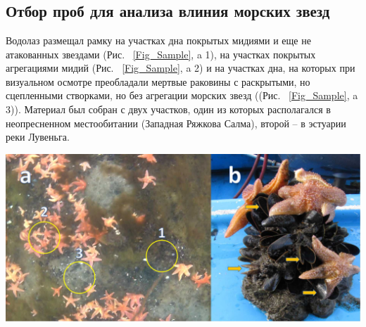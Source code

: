 \documentclass[20pt,a0,portrait]{a0poster}
\begin{document}
\begin{minipage}[t]{0.5\linewidth}

\section*{}

\subsection*{Отбор проб для анализа влиния морских звезд}

%
\begin{minipage}[t]{0.4\linewidth}
Водолаз размещал рамку на участках дна покрытых мидиями и еще не атакованных звездами (Рис. ~\ref{Fig_Sample}, a 1), на участках покрытых агрегациями мидий  (Рис. ~\ref{Fig_Sample}, a 2) и на участках дна, на которых при визуальном осмотре преобладали мертвые раковины с раскрытыми, но сцепленными створками, но без агрегации морских звезд ((Рис. ~\ref{Fig_Sample}, a 3)). Материал был собран с двух участков, один из которых располагался в неопресненном местообитании (Западная Ряжкова Салма), второй -- в эстуарии реки Лувеньга.
\end{minipage}\hspace{1cm}
%
\begin{minipage}[t]{0.5\linewidth}		
	\begin{center}\vspace{0.1cm}
			\includegraphics[width=0.8\linewidth]{Samples.jpg}
			\label{Fig_Sample}
		\end{center}
\end{minipage}\hspace{0.5cm}




\end{minipage}
\end{document}
